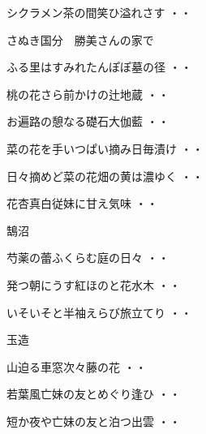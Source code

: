 \vspace{0.6cm}
\begin{shiika}シクラメン茶の間笑ひ溢れさす
\hfill{・・}\end{shiika}
\vspace{0.6cm}
さぬき国分　勝美さんの家で
\begin{shiika}ふる里はすみれたんぽぽ墓の径
\hfill{・・}\end{shiika}
\begin{shiika}桃の花さら前かけの辻地蔵
\hfill{・・}\end{shiika}
\begin{shiika}お遍路の憩なる礎石大伽藍
\hfill{・・}\end{shiika}
\begin{shiika}菜の花を手いつぱい摘み日毎漬け
\hfill{・・}\end{shiika}
\begin{shiika}日々摘めど菜の花畑の黄は濃ゆく
\hfill{・・}\end{shiika}
\begin{shiika}花杏真白従妹に甘え気味
\hfill{・・}\end{shiika}
\vspace{0.6cm}
鵠沼
\begin{shiika}芍薬の蕾ふくらむ庭の日々
\hfill{・・}\end{shiika}
\begin{shiika}発つ朝にうす紅ほのと花水木
\hfill{・・}\end{shiika}
\begin{shiika}いそいそと半袖えらび旅立てり
\hfill{・・}\end{shiika}
\vspace{0.6cm}
玉造
\begin{shiika}山迫る車窓次々藤の花
\hfill{・・}\end{shiika}
\begin{shiika}若葉風亡妹の友とめぐり逢ひ
\hfill{・・}\end{shiika}
\begin{shiika}短か夜や亡妹の友と泊つ出雲
\hfill{・・}\end{shiika}
